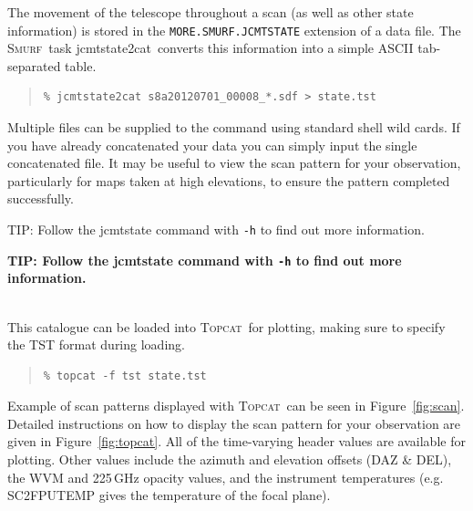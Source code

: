 \documentclass[twoside,11pt]{article}
\newcommand{\htmladdnormallink}[2]{#1}
\newcommand{\htmlref}[2]{#1}
\newenvironment{latexonly}{}{}
\newcommand{\latexhtml}[2]{#1}
\newcommand{\xref}[3]{#1}
\renewcommand{\_}{\texttt{\symbol{95}}}
\newenvironment{fmpage}[1]{\begin{lrbox}{\fmbox}\begin{minipage}{#1}}{\end{minipage}\end{lrbox}\fbox{\usebox{\fmbox}}}
\newenvironment{myquote}{
   \color{MidnightBlue}\begin{quote}\begin{small}}{
   \end{small}\end{quote}
}
\newcommand{\smurf}{\xref{\textsc{Smurf}}{sun258}{}}
\newcommand{\topcat}{\htmladdnormallink{\textsc{Topcat}}{http://www.starlink.ac.uk/topcat}}
\newcommand{\task}[1]{\textsf{#1}}
\newcommand{\jcmtstate}{\xref{\task{jcmtstate2cat}}{sun258}{JCMTSTATE2CAT}}
\newcommand{\cref}[3]{\latexhtml{#1~\ref{#2}}{\htmlref{#3}{#2}}}
\renewenvironment{myquote}{
      \begin{quote}\begin{small}}{
      \end{small}\end{quote}
   }
\begin{document}
The movement of the telescope throughout a scan (as well as other
state information) is stored in the \texttt{MORE.SMURF.JCMTSTATE}
extension of a data file. The \smurf\ task \jcmtstate\ converts this
information into a simple ASCII tab-separated table.

\begin{myquote}
\begin{verbatim}
% jcmtstate2cat s8a20120701_00008_*.sdf > state.tst
\end{verbatim}
\end{myquote}

Multiple files can be supplied to the command using standard shell wild
cards. If you have already
concatenated your data you can simply input the single concatenated
file. It may be useful to view the scan pattern for your
observation, particularly for maps taken at high elevations, to ensure
the pattern completed successfully.


\begin{latexonly}
\begin{center}
\begin{fmpage}{0.95\linewidth}
\vspace{0.1cm}
TIP: Follow the \task{jcmtstate} command with \texttt{-h} to find out more information.
\end{fmpage}
\end{center}
\end{latexonly}

\begin{htmlonly}
  \textbf{TIP: Follow the \task{jcmtstate} command with \texttt{-h} to find out more information.\\\\}
\end{htmlonly}

This catalogue can be loaded into \topcat\ for plotting, making sure
to specify the TST format during loading.

\begin{myquote}
\begin{verbatim}
% topcat -f tst state.tst
\end{verbatim}
\end{myquote}

Example of scan patterns displayed with \topcat\ can be seen in
\cref{Figure}{fig:scan}{telescope tracks}. Detailed instructions on
how to display the scan pattern for your observation are given in
\cref{Figure}{fig:topcat}{box below}.
All of the time-varying header values are available for plotting. Other
values include the azimuth and elevation offsets (DAZ \& DEL), the WVM
and 225\,GHz opacity values, and the instrument temperatures (e.g.
SC2\_FPUTEMP gives the temperature of the focal plane).
\end{document}
